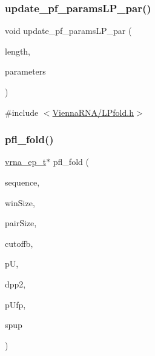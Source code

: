 \subsubsection{\texorpdfstring{update\+\_\+pf\+\_\+params\+L\+P\+\_\+par()}{update\_pf\_paramsLP\_par()}}
{\footnotesize\ttfamily void update\+\_\+pf\+\_\+params\+L\+P\+\_\+par (\begin{DoxyParamCaption}\item[{int}]{length,  }\item[{\mbox{\hyperlink{group__energy__parameters_ga01d8b92fe734df8d79a6169482c7d8d8}{vrna\+\_\+exp\+\_\+param\+\_\+t}} $\ast$}]{parameters }\end{DoxyParamCaption})}



{\ttfamily \#include $<$\mbox{\hyperlink{_l_pfold_8h}{Vienna\+R\+N\+A/\+L\+Pfold.\+h}}$>$}

\mbox{\label{group__local__pf__fold_ga7cdf690583871f9c158a0f91d4785cb6}} 
\subsubsection{\texorpdfstring{pfl\+\_\+fold()}{pfl\_fold()}}
{\footnotesize\ttfamily \mbox{\hyperlink{group__struct__utils_gab9ac98ab55ded9fb90043b024b915aca}{vrna\+\_\+ep\+\_\+t}}$\ast$ pfl\+\_\+fold (\begin{DoxyParamCaption}\item[{char $\ast$}]{sequence,  }\item[{int}]{win\+Size,  }\item[{int}]{pair\+Size,  }\item[{float}]{cutoffb,  }\item[{double $\ast$$\ast$}]{pU,  }\item[{\mbox{\hyperlink{group__struct__utils_gab9ac98ab55ded9fb90043b024b915aca}{vrna\+\_\+ep\+\_\+t}} $\ast$$\ast$}]{dpp2,  }\item[{F\+I\+LE $\ast$}]{p\+Ufp,  }\item[{F\+I\+LE $\ast$}]{spup }\end{DoxyParamCaption})}




